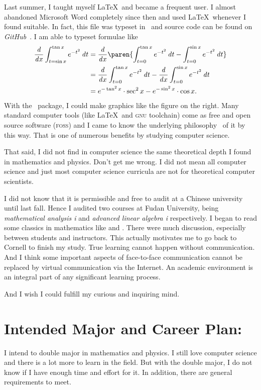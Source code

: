 	Last summer, I taught myself \LaTeX\ and became a frequent user. I almost
	abandoned Microsoft Word completely since then and used \LaTeX\ whenever I found
	suitable. In fact, this file was typeset in \LuaLaTeX\ and source code can be
	found on \textit{GitHub}~\cite{Readmission}. I am able to typeset formulae like
	\begin{align*}
	\dd x \int_{t=\sin x}^{\tan x} e^{-t^2} \dt
		&= \dd x \paren{\int_{t=0}^{\tan x} e^{-t^2} \dt -
			\int_{t=0}^{\sin x} e^{-t^2} \dt} \\
		&= \dd x \int_{t=0}^{\tan x} e^{-t^2} \dt
			- \dd x \int_{t=0}^{\sin x} e^{-t^2} \dt \\
		&= e^{-\tan^2 x} \cdot \sec^2 x - e^{-\sin^2 x} \cdot \cos x.
	\end{align*}
	With the \TikZ\ package, I could make graphics like the figure on the right.
	Many standard computer tools (like \LaTeX\ and \textsc{gnu} toolchain) come as
	free and open source software (\textsc{foss}) and I came to know the underlying
	philosophy~\cite{free-sw} of it by this way. That is one of numerous benefits
	by studying computer science.
	
	
	That said, I did not find in computer science the same theoretical depth I
	found in mathematics and physics. Don't get me wrong. I did not mean all
	computer science and just most computer science curricula are not for
	theoretical computer scientists.
	
	I did not know that it is permissible and free to audit at a Chinese university
	until last fall. Hence I audited two courses at Fudan University, being
	\textit{mathematical analysis \Rn{1}} and \textit{advanced linear algebra
		\Rn{1}} respectively. I began to read some classics in mathematics like
	\textcite{BabyRudin} and \textcite{Zorich}. There were much discussion,
	especially between students and instructors. This actually motivates me to go
	back to Cornell to finish my study. True learning cannot happen without
	communication. And I think some important aspects of face-to-face communication
	cannot be replaced by virtual communication via the Internet. An academic
	environment is an integral part of any significant learning process.
	
	And I wish I could fulfill my curious and inquiring mind.
	
	\section*{Intended Major and Career Plan:}
	I intend to double major in mathematics and physics. I still love computer
	science and there is a lot more to learn in the field. But with the double
	major, I do not know if I have enough time and effort for it. In addition,
	there are general requirements to meet.
	
